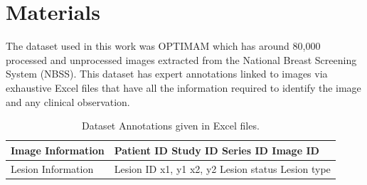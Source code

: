 \documentclass[final,3p,twocolumn,authoryear,sort&compress,times]{maia}
\begin{document}
\section{Materials}
\label{sec:dataset}
The dataset used in this work was OPTIMAM \citet{Optimam} which has around 80,000 processed and unprocessed images extracted from the National Breast Screening System (NBSS). This dataset has expert annotations linked to images via exhaustive Excel files that have all the information required to identify the image and any clinical observation.
\begin{table}
    \centering
        \caption{Dataset Annotations given in Excel files.}
    \begin{tabular}{|p{30mm}|p{25mm}|}
    \hline
        Image Information  &  Patient ID \newline
    Study ID\newline
    Series ID \newline
    Image ID \\
         
         \hline
        Lesion Information & Lesion ID \newline
    x1, y1 \newline
    x2, y2 \newline
    Lesion status \newline
    Lesion type\\
    \hline
    \end{tabular}

    \label{tab:excel_info}
\end{table}
\end{document}
